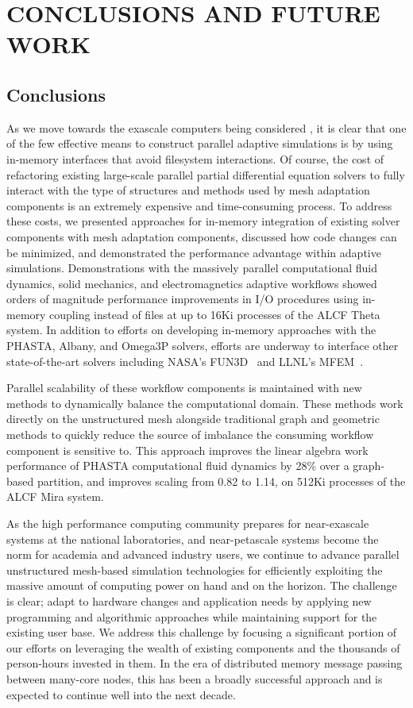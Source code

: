 \chapter{CONCLUSIONS AND FUTURE WORK}
\label{chp:conclusion}
\section{Conclusions}

As we move towards the exascale computers being considered \cite{Cross10,Exa10},
it is clear that one of the few effective means to construct parallel adaptive
simulations is by using in-memory interfaces that avoid filesystem interactions.
Of course, the cost of refactoring existing large-scale parallel partial
differential equation solvers to fully interact with the type of structures and
methods used by mesh adaptation components is an extremely expensive and
time-consuming process.
To address these costs, we presented approaches for in-memory integration of
existing solver components with mesh adaptation components, discussed how code
changes can be minimized, and demonstrated the performance advantage within
adaptive simulations.
Demonstrations with the massively parallel computational fluid dynamics, solid
mechanics, and electromagnetics adaptive workflows showed orders of magnitude
performance improvements in I/O procedures using in-memory coupling instead of
files at up to 16Ki processes of the ALCF Theta system.
In addition to efforts on developing in-memory approaches with the PHASTA,
Albany, and Omega3P solvers, efforts are underway to interface other
state-of-the-art solvers including NASA's FUN3D~\cite{anderson1999achieving} and
LLNL's MFEM~\cite{mfem-library}.

Parallel scalability of these workflow components is maintained with
new methods to dynamically balance the computational domain.
These methods work directly on the unstructured mesh alongside traditional graph
and geometric methods to quickly reduce the source of imbalance the
consuming workflow component is sensitive to.
This approach improves the linear algebra work performance of PHASTA
computational fluid dynamics by 28\% over a graph-based partition, and improves
scaling from 0.82 to 1.14, on 512Ki processes of the ALCF Mira system.

As the high performance computing community prepares for near-exascale systems
at the national laboratories, and near-petascale systems become the norm for academia and
advanced industry users, we continue to advance parallel unstructured mesh-based
simulation technologies for efficiently exploiting the massive amount of
computing power on hand and on the horizon.
The challenge is clear; adapt to hardware changes and application needs by
applying new programming and algorithmic approaches while maintaining support
for the existing user base.
We address this challenge by focusing a significant portion of our efforts on
leveraging the wealth of existing components and the thousands of person-hours
invested in them.
In the era of distributed memory message passing between many-core nodes, this
has been a broadly successful approach and is expected to continue well into the
next decade.

